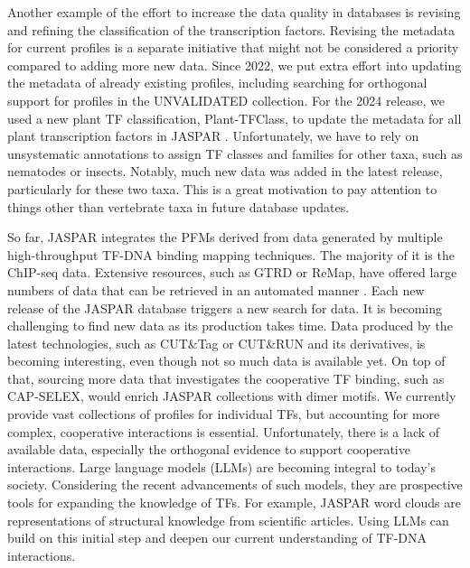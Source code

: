     Another example of the effort to increase the data quality in databases is revising and refining the classification of the transcription factors. Revising the metadata for current profiles is a separate initiative that might not be considered a priority compared to adding more new data. Since 2022, we put extra effort into updating the metadata of already existing profiles, including searching for orthogonal support for profiles in the UNVALIDATED collection. For the 2024 release, we used a new plant TF classification, Plant-TFClass, to update the metadata for all plant transcription factors in JASPAR \cite{blanc2024plant}. Unfortunately, we have to rely on unsystematic annotations to assign TF classes and families for other taxa, such as nematodes or insects. Notably, much new data was added in the latest release, particularly for these two taxa. This is a great motivation to pay attention to things other than vertebrate taxa in future database updates.

    So far, JASPAR integrates the PFMs derived from data generated by multiple high-throughput TF-DNA binding mapping techniques. The majority of it is the ChIP-seq data. Extensive resources, such as GTRD or ReMap, have offered large numbers of data that can be retrieved in an automated manner \cite{kolmykov2021gtrd}. Each new release of the JASPAR database triggers a new search for data. It is becoming challenging to find new data as its production takes time. Data produced by the latest technologies, such as CUT\&Tag or CUT\&RUN and its derivatives, is becoming interesting, even though not so much data is available yet. On top of that, sourcing more data that investigates the cooperative TF binding, such as CAP-SELEX, would enrich JASPAR collections with dimer motifs. We currently provide vast collections of profiles for individual TFs, but accounting for more complex, cooperative interactions is essential. Unfortunately, there is a lack of available data, especially the orthogonal evidence to support cooperative interactions. Large language models (LLMs) are becoming integral to today's society. Considering the recent advancements of such models, they are prospective tools for expanding the knowledge of TFs. For example, JASPAR word clouds are representations of structural knowledge from scientific articles. Using LLMs can build on this initial step and deepen our current understanding of TF-DNA interactions.

